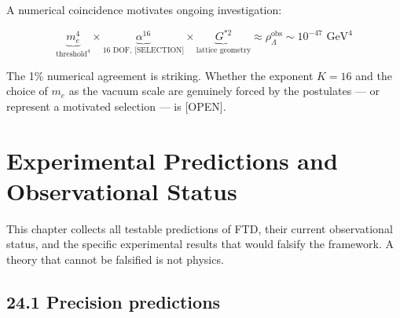 \documentclass[
  11pt,
  letterpaper,
  twoside,
  openright]{book}
\begin{document}
A numerical coincidence motivates ongoing investigation:

\[
\underbrace{m_e^4}_{\text{threshold}^4} \times \underbrace{\alpha^{16}}_{\text{16 DOF, [SELECTION]}} \times \underbrace{G^{*2}}_{\text{lattice geometry}} \approx \rho_\Lambda^\text{obs} \sim 10^{-47} \text{ GeV}^4
\]

The 1\% numerical agreement is striking. Whether the exponent \(K = 16\)
and the choice of \(m_e\) as the vacuum scale are genuinely forced by
the postulates --- or represent a motivated selection --- is {[}OPEN{]}.

\chapter{Experimental Predictions and Observational
Status}\label{sec-predictions}

This chapter collects all testable predictions of FTD, their current
observational status, and the specific experimental results that would
falsify the framework. A theory that cannot be falsified is not physics.

\section{24.1 Precision predictions}\label{precision-predictions}
\end{document}
